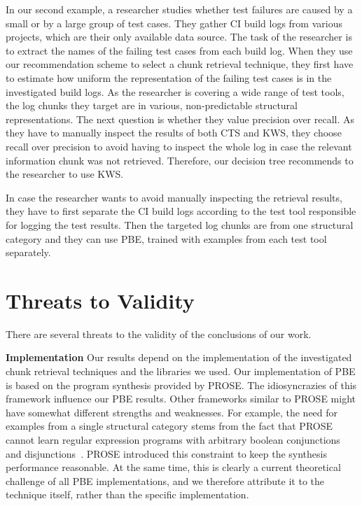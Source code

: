 In our second example, a researcher studies whether test failures
are caused by a small or by a large group of test cases.
They gather
CI build logs from various projects, which are their only available
data source.
The task of the researcher is to extract the names of the
failing test cases from each build log.
When they use our
recommendation scheme to select a chunk retrieval technique, they
first have to estimate how uniform the representation of the failing
test cases is in the investigated build logs.
As the researcher is
covering a wide range of test tools, the
log chunks they target are in various, non-predictable structural
representations.
The next question is whether they value precision
over recall.
As they have to manually inspect the results of both CTS
and KWS, they choose recall over precision to avoid having to inspect
the whole log in case the relevant information chunk was not
retrieved.
Therefore, our decision tree recommends to the researcher to use KWS\@.

In case the researcher wants to avoid manually inspecting the
retrieval results, they have to first separate the CI build logs
according to the test tool responsible for logging the test results.
Then the targeted log chunks are from one structural category and they
can use PBE, trained with examples from each test tool separately.

\section{Threats to Validity}
There are several threats to the validity of the conclusions of our
work.


\textbf{Implementation}
Our results depend on the implementation of the investigated chunk
retrieval techniques and the libraries we used.
Our implementation of
PBE is based on the program synthesis provided by PROSE\@.
The
idiosyncrazies of this framework influence our PBE results.
Other
frameworks similar to PROSE might have somewhat different strengths
and weaknesses.
For example, the need for examples from a single
structural category stems from the fact that PROSE cannot learn
regular expression programs with arbitrary boolean conjunctions and
disjunctions~\cite{mayer2015user}.
PROSE introduced this constraint to
keep the synthesis performance reasonable.
At the same time, this is
clearly a current theoretical challenge of all PBE implementations,
and we therefore attribute it to the technique itself, rather than the
specific implementation.

